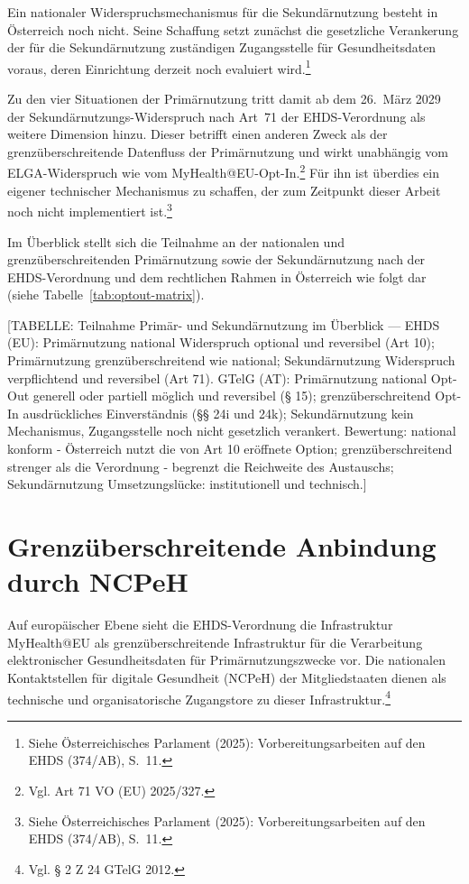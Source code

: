 Ein nationaler Widerspruchsmechanismus für die Sekundärnutzung besteht in
Österreich noch nicht. Seine Schaffung setzt zunächst die gesetzliche
Verankerung der für die Sekundärnutzung zuständigen Zugangsstelle für
Gesundheitsdaten voraus, deren Einrichtung derzeit noch evaluiert
wird.\footnote{Siehe Österreichisches Parlament (2025): Vorbereitungsarbeiten auf den EHDS (374/AB), S.~11.}

Zu den vier Situationen der Primärnutzung tritt damit ab dem 26.~März 2029 der Sekundärnutzungs-Widerspruch nach Art~71 der EHDS-Verordnung als weitere Dimension hinzu. Dieser betrifft einen anderen Zweck als der grenzüberschreitende Datenfluss der Primärnutzung und wirkt unabhängig vom ELGA-Widerspruch wie vom MyHealth@EU-Opt-In.\footnote{Vgl. Art 71 VO (EU) 2025/327.} Für ihn ist überdies ein eigener technischer Mechanismus zu schaffen, der zum Zeitpunkt dieser Arbeit noch nicht implementiert ist.\footnote{Siehe Österreichisches Parlament (2025): Vorbereitungsarbeiten auf den EHDS (374/AB), S.~11.}

Im Überblick stellt sich die Teilnahme an der nationalen und grenzüberschreitenden Primärnutzung sowie der Sekundärnutzung nach der EHDS-Verordnung und dem rechtlichen Rahmen in Österreich wie folgt dar (siehe Tabelle~\ref{tab:optout-matrix}).

[TABELLE: Teilnahme Primär- und Sekundärnutzung im Überblick — EHDS (EU): Primärnutzung national Widerspruch optional und reversibel (Art 10); Primärnutzung grenzüberschreitend wie national; Sekundärnutzung Widerspruch verpflichtend und reversibel (Art 71). GTelG (AT): Primärnutzung national Opt-Out generell oder partiell möglich und reversibel (§ 15); grenzüberschreitend Opt-In ausdrückliches Einverständnis (§§ 24i und 24k); Sekundärnutzung kein Mechanismus, Zugangsstelle noch nicht gesetzlich verankert. Bewertung: national konform - Österreich nutzt die von Art 10 eröffnete Option; grenzüberschreitend strenger als die Verordnung - begrenzt die Reichweite des Austauschs; Sekundärnutzung Umsetzungslücke: institutionell und technisch.]

\section{Grenzüberschreitende Anbindung durch NCPeH}

Auf europäischer Ebene sieht die EHDS-Verordnung die Infrastruktur MyHealth@EU als grenzüberschreitende Infrastruktur für die Verarbeitung elektronischer Gesundheitsdaten für Primärnutzungszwecke vor. Die nationalen Kontaktstellen für digitale Gesundheit (NCPeH) der Mitgliedstaaten dienen als technische und organisatorische Zugangstore zu dieser Infrastruktur.\footnote{Vgl. § 2 Z 24 GTelG 2012.}

